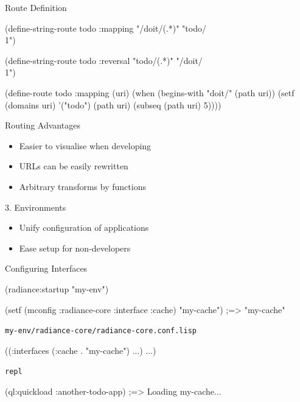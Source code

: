 \documentclass[14pt,t]{beamer}
\def\code#1{{\color{codecolor}\texttt{#1}}}
\renewcommand{\title}[1]{
  {\huge #1} \vskip 0.4cm
}
\begin{document}
\begin{frame}[fragile]
  \title{Route Definition}
\begin{lispcode}
(define-string-route todo :mapping
  "/doit/(.*)" "todo/\\1")

(define-string-route todo :reversal
  "todo/(.*)" "/doit/\\1")
\end{lispcode}
  \pause \vskip 1.0cm
\begin{lispcode}
(define-route todo :mapping (uri)
  (when (begins-with "doit/" (path uri))
    (setf (domains uri) '("todo")
          (path uri) (subseq (path uri) 5))))
\end{lispcode}
\end{frame}

\begin{frame}
  \title{Routing Advantages}
  \begin{itemize}
  \item Easier to visualise when developing
  \item URLs can be easily rewritten
  \item Arbitrary transforms by functions
  \end{itemize}
\end{frame}

\begin{frame}
  \title{3. Environments}
  \begin{itemize}
  \item Unify configuration of applications
  \item Ease setup for non-developers
  \end{itemize}
\end{frame}

\begin{frame}[fragile]
  \title{Configuring Interfaces}
\begin{lispcode}
(radiance:startup "my-env")

(setf (mconfig :radiance-core :interface :cache)
      "my-cache")
  ;=> "my-cache"
\end{lispcode}
  \pause
  \vskip 0.5cm
  {\footnotesize\code{my-env/radiance-core/radiance-core.conf.lisp}}
\begin{lispcode}
((:interfaces (:cache . "my-cache")
              ...)
 ...)
\end{lispcode}
  \pause
  \vskip 0.5cm
  {\footnotesize\code{repl}}
\begin{lispcode}
(ql:quickload :another-todo-app)
  ;=> Loading my-cache...
\end{lispcode}
\end{frame}
\end{document}
